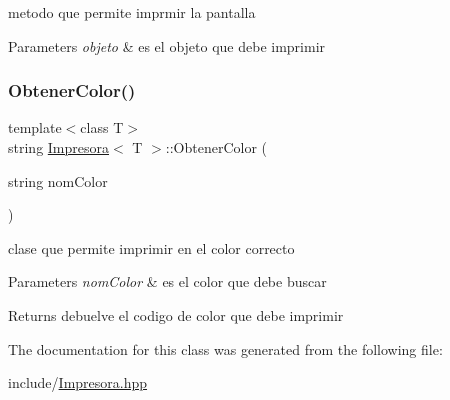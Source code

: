 metodo que permite imprmir la pantalla 


\begin{DoxyParams}{Parameters}
{\em objeto} & es el objeto que debe imprimir \\
\hline
\end{DoxyParams}
\mbox{\label{class_impresora_abab8709ec339f549ef44dae439b33f12}} 
\subsubsection{\texorpdfstring{Obtener\+Color()}{ObtenerColor()}}
{\footnotesize\ttfamily template$<$class T$>$ \\
string \hyperlink{class_impresora}{Impresora}$<$ T $>$\+::Obtener\+Color (\begin{DoxyParamCaption}\item[{string}]{nom\+Color }\end{DoxyParamCaption})\hspace{0.3cm}{\ttfamily [inline]}}



clase que permite imprimir en el color correcto 


\begin{DoxyParams}{Parameters}
{\em nom\+Color} & es el color que debe buscar \\
\hline
\end{DoxyParams}
\begin{DoxyReturn}{Returns}
debuelve el codigo de color que debe imprimir 
\end{DoxyReturn}


The documentation for this class was generated from the following file\+:\begin{DoxyCompactItemize}
\item 
include/\hyperlink{_impresora_8hpp}{Impresora.\+hpp}\end{DoxyCompactItemize}
